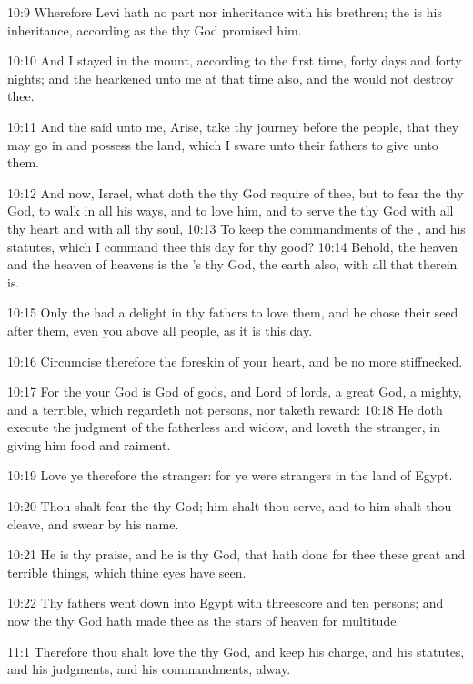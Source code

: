 10:9 Wherefore Levi hath no part nor inheritance with his brethren;
the \LORD is his inheritance, according as the \LORD thy God promised
him.

10:10 And I stayed in the mount, according to the first time, forty
days and forty nights; and the \LORD hearkened unto me at that time
also, and the \LORD would not destroy thee.

10:11 And the \LORD said unto me, Arise, take thy journey before the
people, that they may go in and possess the land, which I sware unto
their fathers to give unto them.

10:12 And now, Israel, what doth the \LORD thy God require of thee, but
to fear the \LORD thy God, to walk in all his ways, and to love him,
and to serve the \LORD thy God with all thy heart and with all thy
soul, 10:13 To keep the commandments of the \LORD, and his statutes,
which I command thee this day for thy good?  10:14 Behold, the heaven
and the heaven of heavens is the \LORD's thy God, the earth also, with
all that therein is.

10:15 Only the \LORD had a delight in thy fathers to love them, and he
chose their seed after them, even you above all people, as it is this
day.

10:16 Circumcise therefore the foreskin of your heart, and be no more
stiffnecked.

10:17 For the \LORD your God is God of gods, and Lord of lords, a great
God, a mighty, and a terrible, which regardeth not persons, nor taketh
reward: 10:18 He doth execute the judgment of the fatherless and
widow, and loveth the stranger, in giving him food and raiment.

10:19 Love ye therefore the stranger: for ye were strangers in the
land of Egypt.

10:20 Thou shalt fear the \LORD thy God; him shalt thou serve, and to
him shalt thou cleave, and swear by his name.

10:21 He is thy praise, and he is thy God, that hath done for thee
these great and terrible things, which thine eyes have seen.

10:22 Thy fathers went down into Egypt with threescore and ten
persons; and now the \LORD thy God hath made thee as the stars of
heaven for multitude.

11:1 Therefore thou shalt love the \LORD thy God, and keep his charge,
and his statutes, and his judgments, and his commandments, alway.

